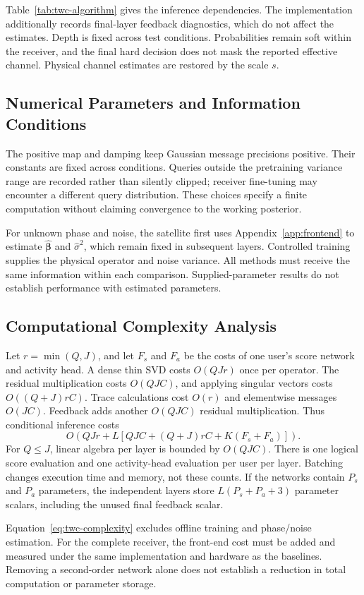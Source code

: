 Table~\ref{tab:twc-algorithm} gives the inference dependencies.
The implementation additionally records final-layer feedback diagnostics,
which do not affect the estimates. Depth is fixed across test conditions.
Probabilities remain soft within the receiver, and the final hard
decision does not mask the reported effective channel.
Physical channel estimates are restored by the scale $s$.

\subsection{Numerical Parameters and Information Conditions}

The positive map and damping keep Gaussian message precisions positive.
Their constants are fixed across conditions. Queries outside the
pretraining variance range are recorded rather than silently clipped;
receiver fine-tuning may encounter a different query distribution.
These choices specify a finite computation without claiming convergence
to the working posterior.

For unknown phase and noise, the satellite first uses
Appendix~\ref{app:frontend} to estimate
$\widehat{\bm\beta}$ and $\widehat\sigma^2$, which remain fixed in
subsequent layers. Controlled training supplies the physical operator
and noise variance. All methods must receive the same information
within each comparison. Supplied-parameter results do not establish
performance with estimated parameters.

\subsection{Computational Complexity Analysis}

Let $r=\min(Q,J)$, and let $F_s$ and $F_a$ be the costs of one
user's score network and activity head. A dense thin SVD costs
$O(QJr)$ once per operator. The residual multiplication costs
$O(QJC)$, and applying singular vectors costs $O((Q+J)rC)$.
Trace calculations cost $O(r)$ and elementwise messages $O(JC)$.
Feedback adds another $O(QJC)$ residual multiplication. Thus
conditional inference costs
\begin{equation}
 O\left(QJr+
 L\left[QJC+(Q+J)rC+K(F_s+F_a)\right]\right).
 \label{eq:twc-complexity}
\end{equation}
For $Q\leq J$, linear algebra per layer is bounded by $O(QJC)$.
There is one logical score evaluation and one activity-head evaluation
per user per layer. Batching changes execution time and memory, not
these counts. If the networks contain $P_s$ and $P_a$ parameters,
the independent layers store $L(P_s+P_a+3)$ parameter scalars,
including the unused final feedback scalar.

Equation~\eqref{eq:twc-complexity} excludes offline training and
phase/noise estimation. For the complete receiver, the front-end cost
must be added and measured under the same implementation and hardware
as the baselines. Removing a second-order network alone does not
establish a reduction in total computation or parameter storage.
